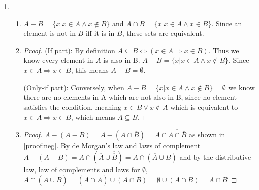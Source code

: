 \documentclass{article}
\begin{document}
\begin{enumerate}
    \item
        \begin{enumerate}
            \item \label{proof:neg} $A - B = \{x | x \in A \land x \not\in B\}$ and $A \cap \overline{B} = \{x | x \in A \land x \in \overline{B}\}$. Since an element is not in $B$ iff it is in $\overline{B}$, these sets are equivalent.
            \item
                \begin{proof}
                    (If part): By definition $A \subseteq B \Leftrightarrow (x \in A \Rightarrow x \in B)$. Thus we know every element in $A$ is also in B. $A - B = \{x | x \in A \land x \not\in B\}$. Since $x \in A \Rightarrow x \in B$, this means $A - B = \emptyset$.

                    (Only-if part): Conversely, when $A - B = \{x|x\in A \land x \not\in B\} = \emptyset$ we know there are no elements in A which are not also in B, since no element satisfies the condition, meaning $ x \in B \lor x \not\in A$ which is equivalent to $x \in A \Rightarrow x \in B$, which means $A \subseteq B$.
                \end{proof}
            \item
                \begin{proof}
                    $A - (A - B) = A - (A \cap \overline B) = A \cap \overline{A \cap \overline{B}}$ as shown in \ref{proof:neg}. By de Morgan's law and laws of complement $A - (A - B) = A \cap (\overline{A} \cup \overline{\overline{B}}) =  A \cap (\overline{A} \cup B)$ and by the distributive law, law of complements and laws for $\emptyset$, $ A \cap (\overline{A} \cup B) = (A \cap \overline{A}) \cup (A \cap B) = \emptyset \cup (A \cap B) = A \cap B$
                \end{proof}


\end{enumerate}
\end{enumerate}
\end{document}
